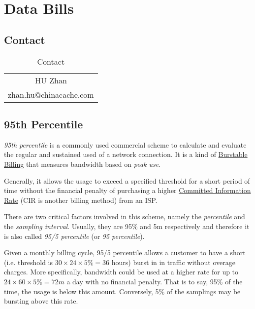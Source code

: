 \chapter{Data Bills}
\label{cha:data-bills}

\section{Contact}
\label{sec:billing-contact}

\begin{table}[!h]
  \centering
  \begin{tabular}[!h]{c}
    \toprule{}
    HU Zhan \\
    zhan.hu@chinacache.com \\
    \bottomrule
  \end{tabular}
  \caption{Contact}
\end{table}

\section{95th Percentile}
\label{sec:95th-percentile}

\textit{95th percentile} is a commonly used commercial scheme to
calculate and evaluate the regular and sustained used of a network
connection. It is a kind of
\href{https://en.wikipedia.org/wiki/Burstable_billing}{Burstable
  Billing} that measures bandwidth based on \textit{peak use}.

Generally, it allows the usage to exceed a specified threshold for
a short period of time without the financial penalty of purchasing
a higher
\href{https://en.wikipedia.org/wiki/Committed_information_rate}{Committed
  Information Rate} (CIR is another billing method) from an ISP.

There are two critical factors involved in this scheme, namely the
\textit{percentile} and the \textit{sampling interval}. Usually,
they are 95\% and 5m respectively and therefore it is also called
\textit{95/5 percentile} (or \textit{95 percentile}).

Given a monthly billing cycle, 95/5 percentile allows a customer
to have a short (i.e. threshold is $30 \times 24 \times 5\% = 36$
hours) burst in in traffic without overage charges. More
specifically, bandwidth could be used at a higher rate for up to
$24 \times 60 \times 5\% = 72m$ a day with no financial
penalty. That is to say, 95\% of the time, the usage is below this
amount. Conversely, 5\% of the samplings may be bursting above
this rate.

